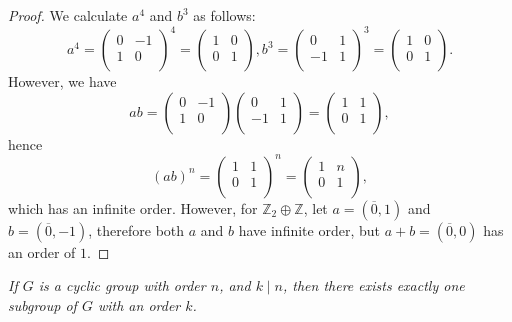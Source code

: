 \begin{proof}
We calculate $a^4$ and $b^3$ as follows:
$$
a^4=\left( \begin{matrix}
	0&		-1\\
	1&		0\\
\end{matrix} \right) ^4=\left( \begin{matrix}
	1&		0\\
	0&		1\\
\end{matrix} \right) ,b^3=\left( \begin{matrix}
	0&		1\\
	-1&		1\\
\end{matrix} \right) ^3=\left( \begin{matrix}
	1&		0\\
	0&		1\\
\end{matrix} \right) .
$$
However, we have 
$$
ab=\left( \begin{matrix}
	0&		-1\\
	1&		0\\
\end{matrix} \right) \left( \begin{matrix}
	0&		1\\
	-1&		1\\
\end{matrix} \right) =\left( \begin{matrix}
	1&		1\\
	0&		1\\
\end{matrix} \right) ,
$$
hence 
$$
\left( ab \right) ^n=\left( \begin{matrix}
	1&		1\\
	0&		1\\
\end{matrix} \right) ^n=\left( \begin{matrix}
	1&		n\\
	0&		1\\
\end{matrix} \right) ,
$$
which has an infinite order. However, for $\mathbb{Z}_2\oplus\mathbb{Z}$, let $a=(\overline{0},1)$ and $b=(\overline{0},-1)$, therefore both $a$ and $b$ have infinite order, but $a+b=(\overline{0},0)$ has an order of $1$.
\end{proof}
\begin{problem}\em
If $G$ is a cyclic group with order $n$, and $k\mid n$, then there exists exactly one subgroup of $G$ with an order $k$.
\end{problem}
